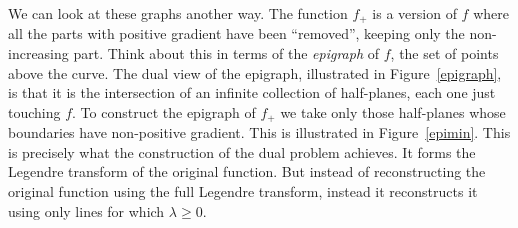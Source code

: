 \documentclass[10pt]{article}
\begin{document}
We can look at these graphs another way.
The function $f_+$ is a version of $f$ where all the parts with positive gradient have been ``removed'', keeping only the non-increasing part.
Think about this in terms of the {\it epigraph} of $f$, the set of points above the curve.
The dual view of the epigraph, illustrated in Figure~\ref{epigraph}, is that it is the intersection of an infinite collection of half-planes, each one just touching $f$.
To construct the epigraph of $f_+$ we take only those half-planes whose boundaries have non-positive gradient.
This is illustrated in Figure~\ref{epimin}.
This is precisely what the construction of the dual problem achieves.
It forms the Legendre transform of the original function.
But instead of reconstructing the original function using the full Legendre transform, instead it reconstructs it using only lines for which $\lambda\ge0$.
\end{document}
